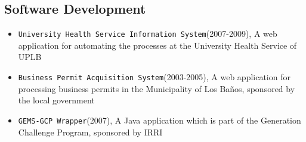\documentclass[overlapped,line,letterpaper]{res}
\begin{document}
\begin{resume}
\section{\bf Software Development}
\begin{itemize}
\item {\texttt{University Health Service Information System}}(2007-2009), A web application for automating the processes at the University Health Service of UPLB
\item {\texttt{Business Permit Acquisition System}}(2003-2005), A web application for processing business permits in the
Municipality of Los Ba\~{n}os, sponsored by the local government
\item {\texttt{GEMS-GCP Wrapper}}(2007), A Java application which is part of the Generation Challenge Program,
sponsored by IRRI
\end{itemize}











\end{resume}
\end{document}
